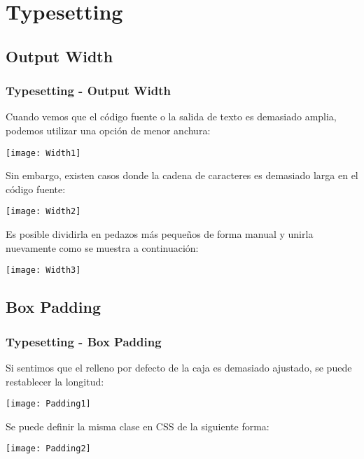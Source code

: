 \documentclass[11pt]{beamer}					%
\begin{document}
\section{Typesetting}

	\subsection{Output Width}
		\begin{frame}
			\frametitle{Typesetting - Output Width}
				\begin{block}{Cuando vemos que el código fuente o la salida de texto es demasiado amplia, podemos utilizar una opción de menor anchura:}
						\begin{center}
						\texttt{[image: Width1]} 
						\end{center}
				\end{block}
				\begin{block}{Sin embargo, existen casos donde la cadena de caracteres es demasiado larga en el código fuente:}
					\begin{small}
						\begin{center}
						\texttt{[image: Width2]} 
						\end{center}
					\end{small}
				\end{block}
				\begin{block}{Es posible dividirla en pedazos más pequeños de forma manual y unirla nuevamente como se muestra a continuación:}
					\begin{small}
						\begin{center}
						\texttt{[image: Width3]} 
						\end{center}
					\end{small}
				\end{block}
		\end{frame}
	\subsection{Box Padding}
		\begin{frame}
			\frametitle{Typesetting - Box Padding}
				\begin{block}{Si sentimos que el relleno por defecto de la caja es demasiado ajustado, se puede restablecer la longitud:}
						\begin{center}
						\texttt{[image: Padding1]} 
						\end{center}
				\end{block}
				\begin{block}{Se puede definir la misma clase en CSS de la siguiente forma:}
					\begin{small}
						\begin{center}
						\texttt{[image: Padding2]} 
						\end{center}
					\end{small}
				\end{block}
		\end{frame}
\end{document}

